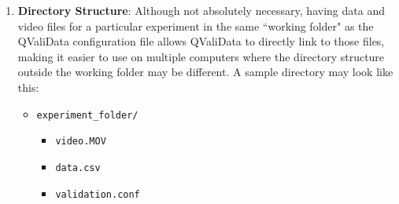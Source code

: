 \documentclass[]{article}
\begin{document}
\begin{enumerate}
			\item \textbf{Directory Structure}: Although not absolutely necessary, having data and video files for a particular experiment in the same ``working folder" as the QValiData configuration file allows QValiData to directly link to those files, making it easier to use on multiple computers where the directory structure outside the working folder may be different. A sample directory may look like this:
			\begin{itemize}
				\item \texttt{experiment\_folder/}
				\begin{itemize}
					\item \texttt{video.MOV}
					\item \texttt{data.csv}
					\item \texttt{validation.conf}
				\end{itemize}
			\end{itemize}
		\end{enumerate}
	
\end{document}

